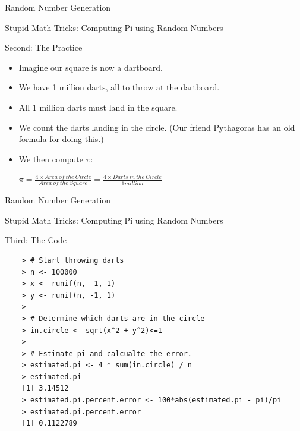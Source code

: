 \documentclass{beamer}
\begin{document}
\begin{frame}{Random Number Generation}

    Stupid Math Tricks: Computing Pi using Random Numbers

    Second: The Practice

    \begin{itemize}
        \item Imagine our square is now a dartboard.
	\item We have 1 million darts, all to throw at the dartboard.
	\item All 1 million darts must land in the square.
	\item We count the darts landing in the circle. (Our friend Pythagoras has an old formula for doing this.)
	\item We then compute $\pi$:

	\begin{math}
	\pi = \frac{4 \times Area\:of\:the\:Circle}{Area\:of\:the\:Square} = \frac{4 \times Darts\:in\:the\:Circle}{1 million}
	\end{math}

    \end{itemize}
\end{frame}

\begin{frame}{Random Number Generation}

    Stupid Math Tricks: Computing Pi using Random Numbers

    Third: The Code

    \begin{verbatim}
    > # Start throwing darts
    > n <- 100000
    > x <- runif(n, -1, 1)
    > y <- runif(n, -1, 1)
    > 
    > # Determine which darts are in the circle
    > in.circle <- sqrt(x^2 + y^2)<=1
    > 
    > # Estimate pi and calcualte the error.
    > estimated.pi <- 4 * sum(in.circle) / n
    > estimated.pi
    [1] 3.14512
    > estimated.pi.percent.error <- 100*abs(estimated.pi - pi)/pi
    > estimated.pi.percent.error
    [1] 0.1122789
    \end{verbatim}

\end{frame}
\end{document}
